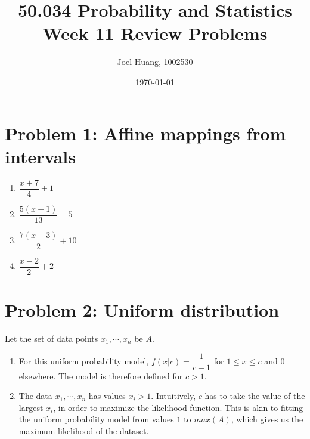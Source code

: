 \documentclass[a4paper]{article}
\title{50.034 Probability and Statistics\\Week 11 Review Problems}
\author{Joel Huang, 1002530}
\date{\today}
\begin{document}
\maketitle

\section{Problem 1: Affine mappings from intervals}
\begin{enumerate}
\item $\dfrac{x+7}{4}+1$
\item $\dfrac{5(x+1)}{13}-5$
\item $\dfrac{7(x-3)}{2}+10$
\item $\dfrac{x-2}{2}+2$
\end{enumerate}

\section{Problem 2: Uniform distribution}
Let the set of data points $x_1, \cdots, x_n$ be $A$.
\begin{enumerate}
\item For this uniform probability model, $f(x|c) = \dfrac{1}{c-1}$ for $ 1\leq x \leq c $ and $0$ elsewhere. The model is therefore defined for $ c > 1 $.
\item The data $x_1, \cdots, x_n$ has values $x_i > 1$. Intuitively, $c$ has to take the value of the largest $x_i$, in order to maximize the likelihood function. This is akin to fitting the uniform probability model from values $1$ to $max(A)$, which gives us the maximum likelihood of the dataset.
\end{enumerate}
\end{document}
